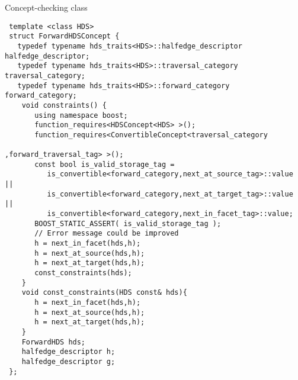 \begin{Desc}
\item[Concept-checking class]

\begin{Code}\begin{verbatim} template <class HDS> 
 struct ForwardHDSConcept {
   typedef typename hds_traits<HDS>::halfedge_descriptor halfedge_descriptor; 
   typedef typename hds_traits<HDS>::traversal_category traversal_category;
   typedef typename hds_traits<HDS>::forward_category forward_category;
    void constraints() {
       using namespace boost;
       function_requires<HDSConcept<HDS> >();
       function_requires<ConvertibleConcept<traversal_category
                                                ,forward_traversal_tag> >();  
       const bool is_valid_storage_tag =
          is_convertible<forward_category,next_at_source_tag>::value ||
          is_convertible<forward_category,next_at_target_tag>::value ||
          is_convertible<forward_category,next_in_facet_tag>::value;
       BOOST_STATIC_ASSERT( is_valid_storage_tag ); 
       // Error message could be improved
       h = next_in_facet(hds,h);
       h = next_at_source(hds,h);
       h = next_at_target(hds,h);
       const_constraints(hds);
    }
    void const_constraints(HDS const& hds){
       h = next_in_facet(hds,h);
       h = next_at_source(hds,h);
       h = next_at_target(hds,h);
    }
    ForwardHDS hds;
    halfedge_descriptor h;
    halfedge_descriptor g;
 };
\end{verbatim}\end{Code}

 \end{Desc}

